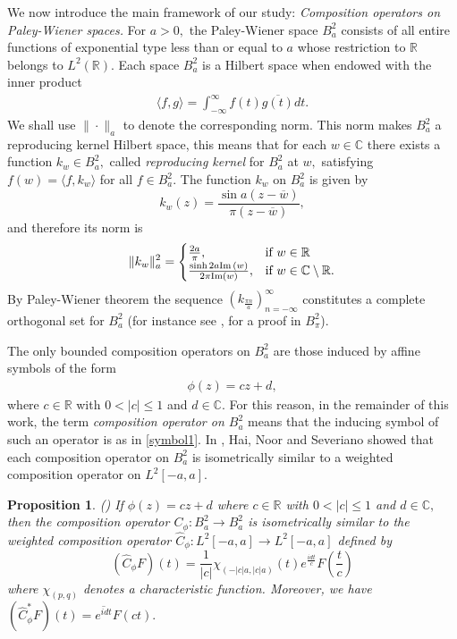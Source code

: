 \documentclass[11pt]{amsart}%
\numberwithin{equation}{section}
\theoremstyle{plain}
\newtheorem{pps}{Proposition}
\theoremstyle{definition}
\theoremstyle{definition}
\newcommand{\im}{{\rm Im}\,}
\begin{document}
We now introduce the main framework of our study: \textit{Composition operators on Paley-Wiener spaces.} For $a>0,$ the Paley-Wiener space $B_a^2$  consists of all entire functions  of exponential type less than or equal to $a$  whose restriction to $\mathbb{R}$ belongs to $L^2(\mathbb{R}).$  Each space $B^2_a$ is a Hilbert space when endowed with the inner product
\begin{align*}
\langle f, g\rangle=\int^{\infty}_{-\infty}f(t)\overline{g(t)}dt.
\end{align*}
We shall use $\|\cdot\|_a$ to denote the corresponding norm. This norm makes $B^2_a$ a reproducing kernel Hilbert space, this means that for each $w\in \mathbb{C}$ there exists a function $k_w\in B^2_a,$ called \textit{reproducing kernel} for $B^2_a$ at $w,$ satisfying $f(w)=\langle f, k_w\rangle$ for all $f\in B^2_a.$ The function $k_w$ on $B^2_a$ is given by  
\begin{equation*}
k_w(z)=\frac{\sin a(z-\overline{w})}{\pi(z-\overline{w})},
\end{equation*}
\cite[Theorem 16]{Branges} and therefore its norm is 
\begin{align}\label{norm of kernel}
\|k_w\|_a^2=
\begin{cases}
\frac{2a}{\pi}, & \text{if} \ w\in \mathbb{R} \\
\frac{\sinh 2a \im(w)}{2\pi\mathrm{Im}(w)},& \text{if} \ w\in  \mathbb{C}\setminus\mathbb{R}.
\end{cases}
\end{align}
By Paley-Wiener theorem the sequence $(k_{\frac{\pi n}{a}})_{n=-\infty}^{\infty}$ constitutes a complete orthogonal set for $B^2_a$ (for instance see \cite{Levin}, for a proof in $B_{\pi}^2$).
 
 The only bounded composition operators on $B^2_a$ are those induced by affine symbols of the form 
\begin{align}\label{symbol1}
\phi(z)=cz+d, 
\end{align}
where $c\in \mathbb{R}$ with $0<|c|\leq 1$ and $d\in \mathbb{C}.$ For this reason, in the remainder of this work, the term \textit{composition operator on $B^2_a$} means that the inducing symbol of such an operator is as in \eqref{symbol1}. In \cite{Hai}, Hai, Noor and Severiano  showed that each composition operator on $B^2_a$ is isometrically similar to a weighted composition operator on $L^2[-a, a].$  


\begin{pps}\label{equivalence operator} \normalfont (\cite[Proposition 1]{Hai}) If $\phi(z)=cz+d$ where $c\in \mathbb{R}$ with $0<|c|\leq 1$ and $d\in \mathbb{C},$ then the composition operator $C_{\phi}:B^2_a\to B^2_a$  is isometrically similar to the weighted composition operator $\widehat{C}_{\phi}: L^2[-a,a]\to L^2[-a,a]$ defined by 
\[(\widehat{C}_{\phi}F)(t)=\frac{1}{|c|}\chi_{(-|c|a, |c|a)}(t)e^{\frac{idt}{c}}F\left(\frac{t}{c}\right)\] 
where $\chi_{(p,q)}$ denotes a characteristic function. Moreover, we have $(\widehat{C}_{\phi}^*F)(t)=\overline{e^{idt}}F(ct).$
\end{pps}
\end{document}
